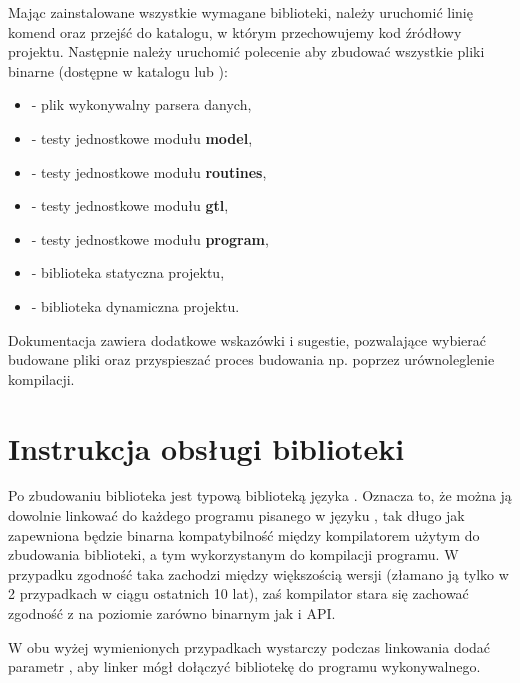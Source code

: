 \documentclass[polish]{standalone}
\begin{document}
Mając zainstalowane wszystkie wymagane biblioteki, należy uruchomić linię komend oraz przejść do katalogu, w którym
przechowujemy kod źródłowy projektu. Następnie należy uruchomić polecenie  aby zbudować wszystkie pliki
binarne (dostępne w katalogu  lub ):
\begin{itemize}
\item {} - plik wykonywalny parsera danych,
\item {} - testy jednostkowe modułu \textbf{model},
\item {} - testy jednostkowe modułu \textbf{routines},
\item {} - testy jednostkowe modułu \textbf{gtl},
\item {} - testy jednostkowe modułu \textbf{program},
\item {} - biblioteka statyczna projektu,
\item {} - biblioteka dynamiczna projektu.
\end{itemize}
Dokumentacja zawiera dodatkowe wskazówki i sugestie, pozwalające wybierać budowane pliki oraz przyspieszać proces 
budowania np. poprzez urównoleglenie kompilacji.

\chapter{Instrukcja obsługi biblioteki}

Po zbudowaniu biblioteka jest typową biblioteką języka . Oznacza to, że można ją dowolnie linkować do każdego
programu pisanego w języku , tak długo jak zapewniona będzie binarna kompatybilność między kompilatorem użytym
do zbudowania biblioteki, a tym wykorzystanym do kompilacji programu. W przypadku  zgodność taka zachodzi
między większością wersji (złamano ją tylko w 2 przypadkach w ciągu ostatnich 10 lat), zaś kompilator  stara
się zachować zgodność z  na poziomie zarówno binarnym jak i API.

W obu wyżej wymienionych przypadkach wystarczy podczas linkowania dodać parametr ,
aby linker mógł dołączyć bibliotekę do programu wykonywalnego.
\end{document}
